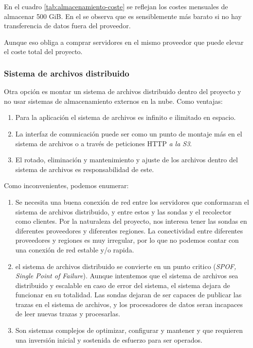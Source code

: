 En el cuadro \ref{tab:almacenamiento-coste} se reflejan los costes mensuales de almacenar 500 GiB. 
En el se observa que es sensiblemente más barato si no hay transferencia de datos fuera del proveedor. 

Aunque eso obliga a comprar servidores en el mismo proveedor que puede elevar el coste total del proyecto.

\subsubsection{Sistema de archivos distribuido}

Otra opción es montar un sistema de archivos distribuido dentro del proyecto y no usar sistemas de almacenamiento externos
en la nube. Como ventajas:

\begin{enumerate}
    \item Para la aplicación el sistema de archivos es infinito e ilimitado en espacio.
    \item La interfaz de comunicación puede ser como un punto de montaje más en el sistema de archivos o a través de 
    peticiones HTTP \emph{a la S3}.
    \item El rotado, eliminación y mantenimiento y ajuste de los archivos dentro del sistema de archivos es responsabilidad de este.
\end{enumerate}

Como inconvenientes, podemos enumerar:


\begin{enumerate}
    \item Se necesita una buena conexión de red entre los servidores que conformaran el sistema de archivos distribuido, y entre estos y las sondas y el recolector como clientes. 
    Por la naturaleza del proyecto, nos interesa tener las sondas en diferentes proveedores y diferentes regiones. La conectividad entre diferentes proveedores y regiones es muy irregular, por lo que no podemos contar con una conexión de red estable y/o rapida.
    \item el sistema de archivos distribuido se convierte en un punto critico (\emph{SPOF, Single Point of Failure}). Aunque intentemos que el sistema de archivos sea distribuido y escalable en caso de error del sistema, el sistema dejara de funcionar en su totalidad.
    Las sondas dejaran de ser capaces de publicar las trazas en el sistema de archivos, y los procesadores de datos seran incapaces de leer nuevas trazas y procesarlas.
    \item Son sistemas complejos de optimizar, configurar y mantener y que requieren una inversión inicial y sostenida de esfuerzo para ser operados.
\end{enumerate}

